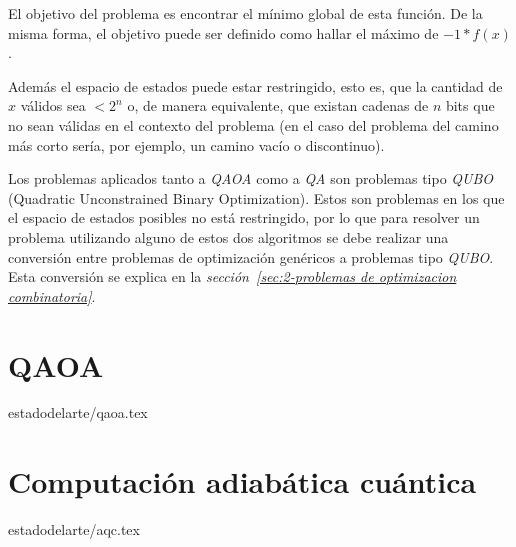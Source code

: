 El objetivo del problema es encontrar el mínimo global de esta función. De la misma forma, el objetivo puede ser definido como hallar el máximo de $-1*f(x)$.

Además el espacio de estados puede estar restringido, esto es, que la cantidad de $x$ válidos sea $< 2^n$ o, de manera equivalente, que existan cadenas de $n$ bits que no sean válidas en el contexto del problema (en el caso del problema del camino más corto sería, por ejemplo, un camino vacío o discontinuo).

Los problemas aplicados tanto a \textit{QAOA} como a \textit{QA} son problemas tipo \textit{QUBO} (Quadratic Unconstrained Binary Optimization).
Estos son problemas en los que el espacio de estados posibles no está restringido, por lo que para resolver un problema utilizando alguno de estos dos algoritmos se debe realizar una conversión entre problemas de optimización genéricos a problemas tipo \textit{QUBO}. Esta conversión se explica en la \textit{sección~\ref{sec:2-problemas de optimizacion combinatoria}}.


\section{QAOA}{estadodelarte/qaoa.tex}

\section{Computación adiabática cuántica}{estadodelarte/aqc.tex}

